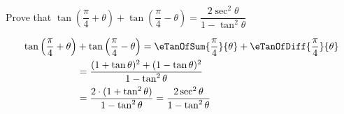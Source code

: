 
%
%
%
%
% 
% 

\question[2] Prove that $\tan\left(\dfrac{\pi}{4} + \theta\right) + 
\tan\left(\dfrac{\pi}{4} - \theta\right) = \dfrac{2\sec^2\theta}{1-\tan^2\theta}$


\ifprintanswers
\fi 

\begin{solution}[\halfpage]
	\begin{fullwidth}
	\begin{align}
		\tan\left(\dfrac{\pi}{4} + \theta\right) &+ \tan\left(\dfrac{\pi}{4} - \theta\right) = 
		\eTanOfSum{\frac{\pi}{4}}{\theta} + \eTanOfDiff{\frac{\pi}{4}}{\theta} \\
		&= \dfrac{(1+\tan\theta)^2 + (1-\tan\theta)^2}{1-\tan^2\theta} \\
		&= \dfrac{2\cdot(1 + \tan^2\theta)}{1-\tan^2\theta} = \dfrac{2\sec^2\theta}{1-\tan^2\theta}
	\end{align}
	\end{fullwidth}
\end{solution}
